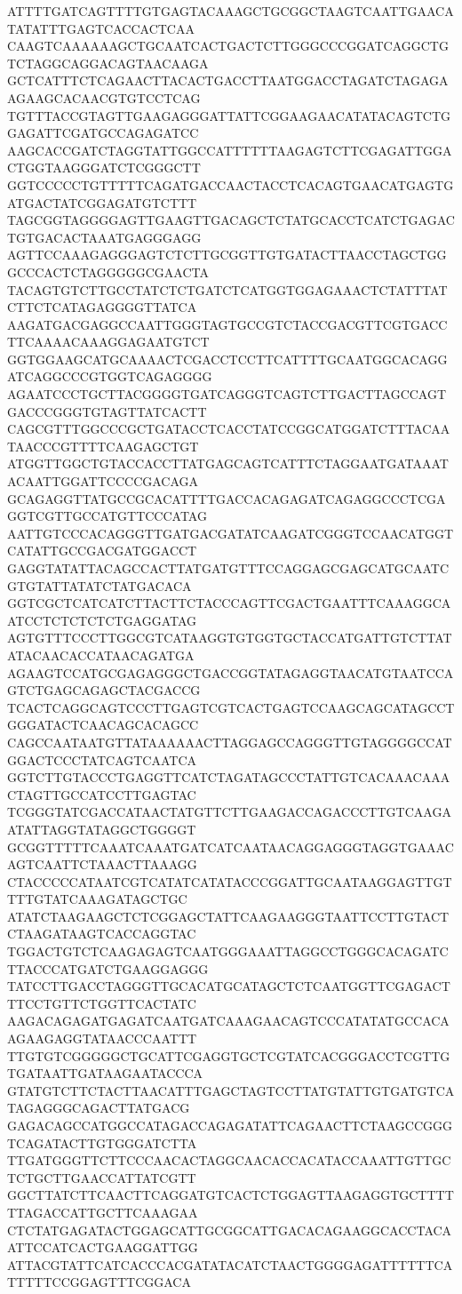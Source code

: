 ATTTTGATCAGTTTTGTGAGTACAAAGCTGCGGCTAAGTCAATTGAACATATATTTGAGTCACCACTCAA
CAAGTCAAAAAAGCTGCAATCACTGACTCTTGGGCCCGGATCAGGCTGTCTAGGCAGGACAGTAACAAGA
GCTCATTTCTCAGAACTTACACTGACCTTAATGGACCTAGATCTAGAGAAGAAGCACAACGTGTCCTCAG
TGTTTACCGTAGTTGAAGAGGGATTATTCGGAAGAACATATACAGTCTGGAGATTCGATGCCAGAGATCC
AAGCACCGATCTAGGTATTGGCCATTTTTTAAGAGTCTTCGAGATTGGACTGGTAAGGGATCTCGGGCTT
GGTCCCCCTGTTTTTCAGATGACCAACTACCTCACAGTGAACATGAGTGATGACTATCGGAGATGTCTTT
TAGCGGTAGGGGAGTTGAAGTTGACAGCTCTATGCACCTCATCTGAGACTGTGACACTAAATGAGGGAGG
AGTTCCAAAGAGGGAGTCTCTTGCGGTTGTGATACTTAACCTAGCTGGGCCCACTCTAGGGGGCGAACTA
TACAGTGTCTTGCCTATCTCTGATCTCATGGTGGAGAAACTCTATTTATCTTCTCATAGAGGGGTTATCA
AAGATGACGAGGCCAATTGGGTAGTGCCGTCTACCGACGTTCGTGACCTTCAAAACAAAGGAGAATGTCT
GGTGGAAGCATGCAAAACTCGACCTCCTTCATTTTGCAATGGCACAGGATCAGGCCCGTGGTCAGAGGGG
AGAATCCCTGCTTACGGGGTGATCAGGGTCAGTCTTGACTTAGCCAGTGACCCGGGTGTAGTTATCACTT
CAGCGTTTGGCCCGCTGATACCTCACCTATCCGGCATGGATCTTTACAATAACCCGTTTTCAAGAGCTGT
ATGGTTGGCTGTACCACCTTATGAGCAGTCATTTCTAGGAATGATAAATACAATTGGATTCCCCGACAGA
GCAGAGGTTATGCCGCACATTTTGACCACAGAGATCAGAGGCCCTCGAGGTCGTTGCCATGTTCCCATAG
AATTGTCCCACAGGGTTGATGACGATATCAAGATCGGGTCCAACATGGTCATATTGCCGACGATGGACCT
GAGGTATATTACAGCCACTTATGATGTTTCCAGGAGCGAGCATGCAATCGTGTATTATATCTATGACACA
GGTCGCTCATCATCTTACTTCTACCCAGTTCGACTGAATTTCAAAGGCAATCCTCTCTCTCTGAGGATAG
AGTGTTTCCCTTGGCGTCATAAGGTGTGGTGCTACCATGATTGTCTTATATACAACACCATAACAGATGA
AGAAGTCCATGCGAGAGGGCTGACCGGTATAGAGGTAACATGTAATCCAGTCTGAGCAGAGCTACGACCG
TCACTCAGGCAGTCCCTTGAGTCGTCACTGAGTCCAAGCAGCATAGCCTGGGATACTCAACAGCACAGCC
CAGCCAATAATGTTATAAAAAACTTAGGAGCCAGGGTTGTAGGGGCCATGGACTCCCTATCAGTCAATCA
GGTCTTGTACCCTGAGGTTCATCTAGATAGCCCTATTGTCACAAACAAACTAGTTGCCATCCTTGAGTAC
TCGGGTATCGACCATAACTATGTTCTTGAAGACCAGACCCTTGTCAAGAATATTAGGTATAGGCTGGGGT
GCGGTTTTTCAAATCAAATGATCATCAATAACAGGAGGGTAGGTGAAACAGTCAATTCTAAACTTAAAGG
CTACCCCCATAATCGTCATATCATATACCCGGATTGCAATAAGGAGTTGTTTTGTATCAAAGATAGCTGC
ATATCTAAGAAGCTCTCGGAGCTATTCAAGAAGGGTAATTCCTTGTACTCTAAGATAAGTCACCAGGTAC
TGGACTGTCTCAAGAGAGTCAATGGGAAATTAGGCCTGGGCACAGATCTTACCCATGATCTGAAGGAGGG
TATCCTTGACCTAGGGTTGCACATGCATAGCTCTCAATGGTTCGAGACTTTCCTGTTCTGGTTCACTATC
AAGACAGAGATGAGATCAATGATCAAAGAACAGTCCCATATATGCCACAAGAAGAGGTATAACCCAATTT
TTGTGTCGGGGGCTGCATTCGAGGTGCTCGTATCACGGGACCTCGTTGTGATAATTGATAAGAATACCCA
GTATGTCTTCTACTTAACATTTGAGCTAGTCCTTATGTATTGTGATGTCATAGAGGGCAGACTTATGACG
GAGACAGCCATGGCCATAGACCAGAGATATTCAGAACTTCTAAGCCGGGTCAGATACTTGTGGGATCTTA
TTGATGGGTTCTTCCCAACACTAGGCAACACCACATACCAAATTGTTGCTCTGCTTGAACCATTATCGTT
GGCTTATCTTCAACTTCAGGATGTCACTCTGGAGTTAAGAGGTGCTTTTTTAGACCATTGCTTCAAAGAA
CTCTATGAGATACTGGAGCATTGCGGCATTGACACAGAAGGCACCTACAATTCCATCACTGAAGGATTGG
ATTACGTATTCATCACCCACGATATACATCTAACTGGGGAGATTTTTTCATTTTTCCGGAGTTTCGGACA
